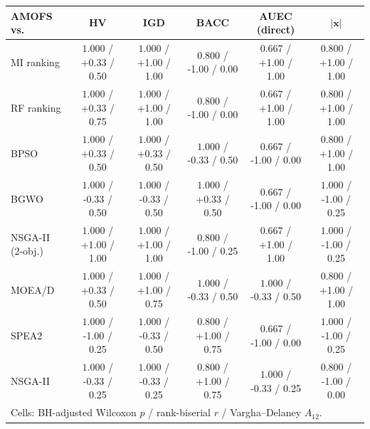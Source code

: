 \begin{tabular}{lccccc}
\toprule
AMOFS vs. & HV & IGD & BACC & AUEC (direct) & $|\mathbf{x}|$ \\
\midrule
MI ranking & $1.000$ / +0.33 / 0.50 & $1.000$ / +1.00 / 1.00 & $0.800$ / -1.00 / 0.00 & $0.667$ / +1.00 / 1.00 & $0.800$ / +1.00 / 1.00 \\
RF ranking & $1.000$ / +0.33 / 0.75 & $1.000$ / +1.00 / 1.00 & $0.800$ / -1.00 / 0.00 & $0.667$ / +1.00 / 1.00 & $0.800$ / +1.00 / 1.00 \\
BPSO & $1.000$ / +0.33 / 0.50 & $1.000$ / +0.33 / 0.50 & $1.000$ / -0.33 / 0.50 & $0.667$ / -1.00 / 0.00 & $0.800$ / +1.00 / 1.00 \\
BGWO & $1.000$ / -0.33 / 0.50 & $1.000$ / -0.33 / 0.50 & $1.000$ / +0.33 / 0.50 & $0.667$ / -1.00 / 0.00 & $1.000$ / -1.00 / 0.25 \\
NSGA-II (2-obj.) & $1.000$ / +1.00 / 1.00 & $1.000$ / +1.00 / 1.00 & $0.800$ / -1.00 / 0.25 & $0.667$ / +1.00 / 1.00 & $1.000$ / -1.00 / 0.25 \\
MOEA/D & $1.000$ / +0.33 / 0.50 & $1.000$ / +1.00 / 0.75 & $1.000$ / -0.33 / 0.50 & $1.000$ / -0.33 / 0.50 & $0.800$ / +1.00 / 1.00 \\
SPEA2 & $1.000$ / -1.00 / 0.25 & $1.000$ / -0.33 / 0.50 & $0.800$ / +1.00 / 0.75 & $0.667$ / -1.00 / 0.00 & $1.000$ / -1.00 / 0.25 \\
NSGA-II & $1.000$ / -0.33 / 0.25 & $1.000$ / -0.33 / 0.25 & $0.800$ / +1.00 / 0.75 & $1.000$ / -0.33 / 0.25 & $0.800$ / -1.00 / 0.00 \\
\bottomrule
\multicolumn{6}{l}{\footnotesize Cells: BH-adjusted Wilcoxon $p$ / rank-biserial $r$ / Vargha--Delaney $\hat A_{12}$.} \\
\end{tabular}
